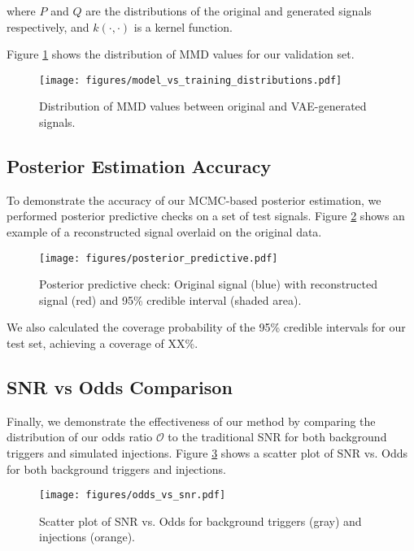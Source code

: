 \documentclass[twocolumn]{aastex631}
\begin{document}
where $P$ and $Q$ are the distributions of the original and generated signals respectively, and $k(\cdot,\cdot)$ is a kernel function.

Figure \ref{fig:mmd_comparison} shows the distribution of MMD values for our validation set.

\begin{figure}[h]
    \centering
    \texttt{[image: figures/model\_vs\_training\_distributions.pdf]}
    \caption{Distribution of MMD values between original and VAE-generated signals.}
    \label{fig:mmd_comparison}
\end{figure}

\subsection{Posterior Estimation Accuracy}
To demonstrate the accuracy of our MCMC-based posterior estimation, we performed posterior predictive checks on a set of test signals. 
Figure \ref{fig:posterior_check} shows an example of a reconstructed signal overlaid on the original data.

\begin{figure}[h]
    \centering
    \texttt{[image: figures/posterior\_predictive.pdf]}
    \caption{Posterior predictive check: Original signal (blue) with reconstructed signal (red) and 95\% credible interval (shaded area).}
    \label{fig:posterior_check}
\end{figure}

We also calculated the coverage probability of the 95\% credible intervals for our test set, achieving a coverage of XX\%.

\subsection{SNR vs Odds Comparison}


Finally, we demonstrate the effectiveness of our method by comparing the distribution of our odds ratio $\mathcal{O}$ to the traditional SNR for both background triggers and simulated injections. 
Figure \ref{fig:snr_vs_odds} shows a scatter plot of SNR vs. Odds for both background triggers and injections.

\begin{figure}[h]
    \centering
    \texttt{[image: figures/odds\_vs\_snr.pdf]}
    \caption{Scatter plot of SNR vs. Odds for background triggers (gray) and injections (orange).}
    \label{fig:snr_vs_odds}
\end{figure}
\end{document}

